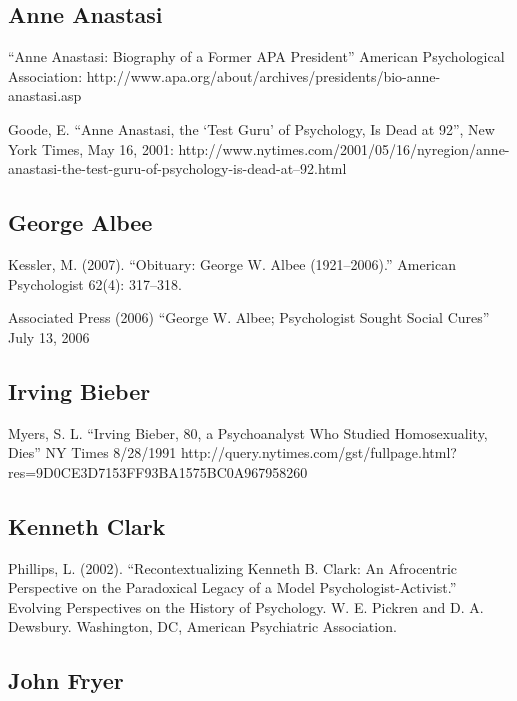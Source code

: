 \begin{refsection}
\begin{appendices}
\subsection{Anne Anastasi}
\label{anneanastasi}

“Anne Anastasi: Biography of a Former APA President” American Psychological Association: http:\slash \slash www.apa.org\slash about\slash archives\slash presidents\slash bio-anne-anastasi.asp

Goode, E. “Anne Anastasi, the `Test Guru' of Psychology, Is Dead at 92”, New York Times, May 16, 2001: http:\slash \slash www.nytimes.com\slash 2001\slash 05\slash 16\slash nyregion\slash anne-anastasi-the-test-guru-of-psychology-is-dead-at--92.html 

\subsection{George Albee}
\label{georgealbee}

Kessler, M. (2007). ``Obituary: George W. Albee (1921--2006).'' American Psychologist 62(4): 317--318. 

Associated Press (2006) “George W. Albee; Psychologist Sought Social Cures” July 13, 2006

\subsection{Irving Bieber}
\label{irvingbieber}

Myers, S. L. “Irving Bieber, 80, a Psychoanalyst Who Studied Homosexuality, Dies” NY Times 8\slash 28\slash 1991 http:\slash \slash query.nytimes.com\slash gst\slash fullpage.html?res=9D0CE3D7153FF93BA1575BC0A967958260

\subsection{Kenneth Clark}
\label{kennethclark}

Phillips, L. (2002). “Recontextualizing Kenneth B. Clark: An Afrocentric Perspective on the Paradoxical Legacy of a Model Psychologist-Activist.” Evolving Perspectives on the History of Psychology. W. E. Pickren and D. A. Dewsbury. Washington, DC, American Psychiatric Association. 

\subsection{John Fryer}
\label{johnfryer}


\end{appendices}
\end{refsection}
